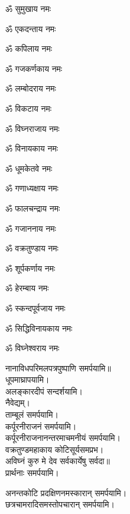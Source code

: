 \begin{enumerate}%
\begin{minipage}{0.475\linewidth}   
\item ॐ सुमुखाय नमः
\item ॐ एकदन्ताय नमः
\item ॐ कपिलाय नमः
\item ॐ गजकर्णकाय नमः
\item ॐ लम्बोदराय नमः
\item ॐ विकटाय नमः
\item ॐ विघ्नराजाय नमः
\item ॐ विनायकाय नमः
\item ॐ धूमकेतवे नमः
  \end{minipage}
  \begin{minipage}{0.525\linewidth}
\item ॐ गणाध्यक्षाय नमः
\item ॐ फालचन्द्राय नमः
\item ॐ गजाननाय नमः
\item ॐ वक्रतुण्डाय नमः
\item ॐ शूर्पकर्णाय नमः
\item ॐ हेरम्बाय नमः
\item ॐ स्कन्दपूर्वजाय नमः
\item ॐ सिद्धिविनायकाय नमः
\item ॐ विघ्नेश्वराय नमः
  \end{minipage}
\end{enumerate}
नानाविधपरिमलपत्रपुष्पाणि समर्पयामि॥\\
धूपमाघ्रापयामि।\\
अलङ्कारदीपं सन्दर्शयामि।\\
नैवेद्यम्।\\
ताम्बूलं समर्पयामि।\\
कर्पूरनीराजनं समर्पयामि।\\
कर्पूरनीराजनानन्तरमाचमनीयं समर्पयामि।\\
{वक्रतुण्डमहाकाय कोटिसूर्यसमप्रभ।}\\
{अविघ्नं कुरु मे देव सर्वकार्येषु सर्वदा॥}\\
प्रार्थनाः समर्पयामि।

अनन्तकोटि प्रदक्षिणनमस्कारान् समर्पयामि।\\
छत्रचामरादिसमस्तोपचारान् समर्पयामि।\\


